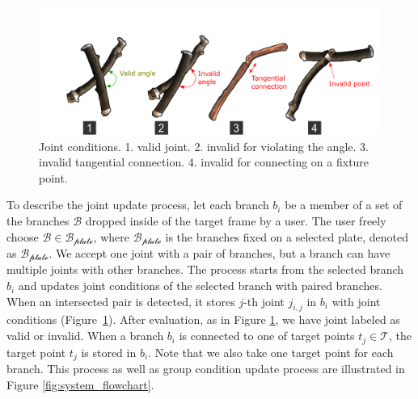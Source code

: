 \begin{figure}[ht]
	\begin{center}
		\includegraphics[width = 0.4\paperwidth]{images/system/joint_conditions_2.png}
		\caption{Joint conditions. 1. valid joint. 2. invalid for violating the angle. 3. invalid tangential connection. 4. invalid for connecting on a fixture point. }
		\label{fig:joint_condition}
	\end{center}
\end{figure}




To describe the joint update process, let each branch $b_i$ be a member of a set of the branches $\mathcal{B}$ dropped inside of the target frame by a user.
The user freely choose $\mathcal{B} \in \mathcal{B_{plate}}$, where $\mathcal{B_{plate}}$ is the branches fixed on a selected plate, denoted as $\mathcal{B_{plate}}$.
We accept one joint with a pair of branches, but a branch can have multiple joints with other branches. 
The process starts from the selected branch $b_i$ and updates joint conditions of the selected branch with paired branches.
When an intersected pair is detected, it stores $j$-th joint $j_{i, j}$ in $b_i$ with joint conditions (Figure~\ref{fig:joint_condition}).
After evaluation, as in Figure \ref{fig:joint_condition},  we have joint labeled as valid or invalid.
When a branch $b_i$ is connected to one of target points $t_j \in \mathcal{T}$, the target point $t_j$ is stored in $b_i$.
Note that we also take one target point for each branch.
This process as well as group condition update process are illustrated in Figure \ref{fig:system_flowchart}.

